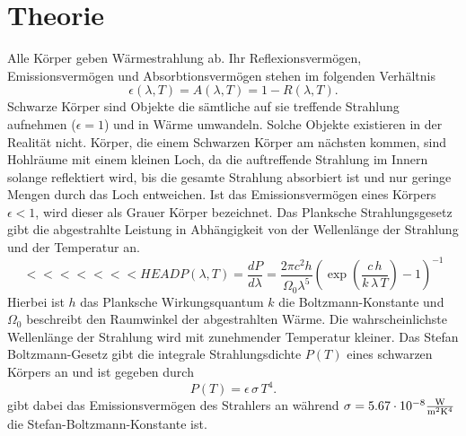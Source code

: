 \section{Theorie}
\label{sec:Theorie}
Alle Körper geben Wärmestrahlung ab. Ihr Reflexionsvermögen, Emissionsvermögen und
Absorbtionsvermögen stehen im folgenden Verhältnis
\begin{equation}
  \epsilon(\lambda,T)=A(\lambda,T)=1-R(\lambda,T).
  \label{eqn:verhaeltnisse}
\end{equation}
Schwarze Körper sind Objekte die sämtliche auf sie treffende Strahlung aufnehmen
($\epsilon=1$) und in Wärme umwandeln. Solche Objekte existieren in der Realität
nicht. Körper, die einem Schwarzen Körper am nächsten kommen, sind Hohlräume mit
einem kleinen Loch, da die auftreffende Strahlung im Innern solange reflektiert
wird, bis die gesamte Strahlung absorbiert ist und nur geringe Mengen durch das
Loch entweichen. Ist das Emissionsvermögen eines Körpers $\epsilon< 1$, wird
dieser als Grauer Körper bezeichnet. Das Planksche Strahlungsgesetz gibt die
abgestrahlte Leistung in Abhängigkeit von der Wellenlänge der Strahlung und der
Temperatur an.
\begin{equation}
<<<<<<< HEAD
  P(\lambda,T)=\frac{dP}{d\lambda}=\frac{2\pi c^2h}{\Omega_0\lambda^5}
  \left(\exp{ \left(\frac{c\,h}{k\,\lambda\,T}\right)} -1 \right)^{-1}
\end{equation}
Hierbei ist $h$ das Planksche Wirkungsquantum $k$ die Boltzmann-Konstante
und $\Omega_0$ beschreibt den Raumwinkel der abgestrahlten Wärme. Die wahrscheinlichste
Wellenlänge der Strahlung wird mit zunehmender Temperatur kleiner. Das
Stefan Boltzmann-Gesetz gibt die integrale Strahlungsdichte $P(T)$ eines schwarzen
Körpers an und ist gegeben durch
\begin{equation}
  P(T)=\epsilon \, \sigma \, T^4.
\end{equation}
\epsilon gibt dabei das Emissionsvermögen des Strahlers an während
$\sigma=5.67\cdot 10^{-8} \si{\frac{\watt}{\meter^2\kelvin^4}}$ die
Stefan-Boltzmann-Konstante ist.
\cite{sample}
